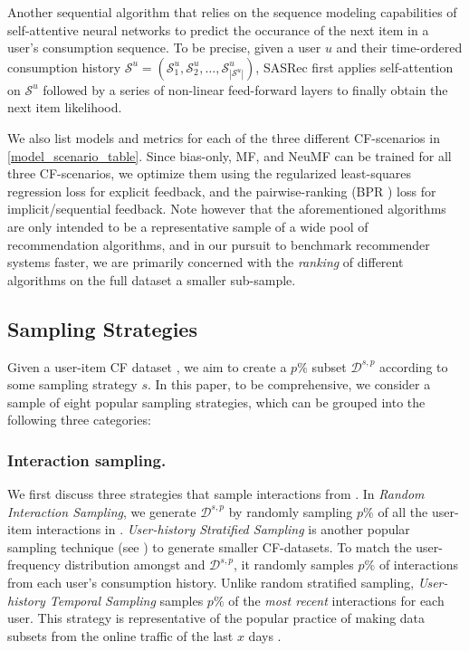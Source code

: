 \begin{itemize}
     Another sequential algorithm that relies on the sequence modeling capabilities of self-attentive neural networks \cite{self_attention} to predict the occurance of the 
    next item
    in a user's consumption sequence. To be precise, given a user $u$ and 
    their
    time-ordered consumption history  $\mathcal{S}^u = (\mathcal{S}^u_1, \mathcal{S}^u_2, \ldots, \mathcal{S}^u_{|\mathcal{S}^u|})$, SASRec first applies self-attention on $\mathcal{S}^u$ followed by a series of non-linear feed-forward layers to finally obtain the next item likelihood.
\end{itemize}
We also list 
models and metrics for each of the three different CF-scenarios in \cref{model_scenario_table}. Since bias-only, MF, and NeuMF can be trained for all three CF-scenarios, we optimize them using the regularized least-squares regression loss for explicit feedback, and the pairwise-ranking (BPR \cite{bpr}) loss for implicit/sequential feedback. Note however that the aforementioned algorithms are only intended to be a representative sample of a 
wide pool
of recommendation algorithms, and in our pursuit to benchmark recommender systems faster, we are primarily concerned with the \emph{ranking} of different algorithms on the full dataset \vs a smaller sub-sample.



\subsection{Sampling Strategies} \label{common_sampling_schemes}
Given a user-item CF dataset \dataset, we aim to create a $p\%$ subset $\mathcal{D}^{s, p}$ according to some sampling strategy $s$. In this paper, to be comprehensive, we consider a sample of eight popular sampling strategies, which can be grouped into the following three categories:

\subsubsection{Interaction sampling. \ \ } We first discuss three strategies that sample interactions from \dataset. In \emph{Random Interaction Sampling}, we generate $\mathcal{D}^{s, p}$ by randomly sampling $p\%$ of all the user-item interactions in \dataset. \emph{User-history Stratified Sampling} is another popular sampling technique (see \eg \cite{svae, handbook}) to generate smaller CF-datasets. To match the user-frequency distribution amongst \dataset and $\mathcal{D}^{s, p}$, it randomly samples $p\%$ of interactions from each user's consumption history. Unlike random stratified sampling, \emph{User-history Temporal Sampling} samples $p\%$ of the \emph{most recent} interactions for each user. This strategy is representative of the popular practice of making data subsets from the online traffic of the last $x$ days \cite{eclare, pfastre}.


